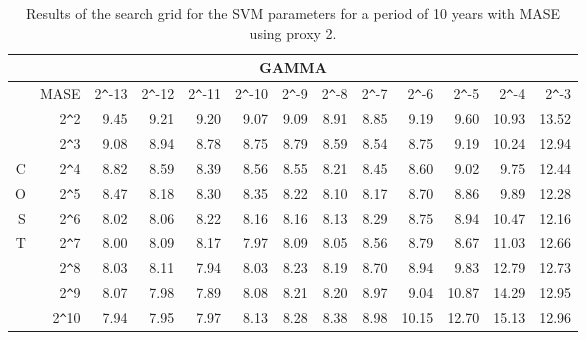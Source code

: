 \begin{table}[h!]
\centering
\begin{adjustbox}{width=\textwidth}
\begin{tabular}{|r|r|rrrrrrrrrrr|}
\hline
\multicolumn{13}{|c|}{GAMMA} \tabularnewline
\hline
 &MASE& 2\verb|^|-13 & 2\verb|^|-12 & 2\verb|^|-11 & 2\verb|^|-10 & 2\verb|^|-9 & 2\verb|^|-8 & 2\verb|^|-7 & 2\verb|^|-6 & 2\verb|^|-5 & 2\verb|^|-4 & 2\verb|^|-3 \\ 
  \hline
  &2\verb|^|2 & 9.45 & 9.21 & 9.20 & 9.07 & 9.09 & 8.91 & 8.85 & 9.19 & 9.60 & 10.93 & 13.52 \\ 
  &2\verb|^|3 & 9.08 & 8.94 & 8.78 & 8.75 & 8.79 & 8.59 & 8.54 & 8.75 & 9.19 & 10.24 & 12.94 \\ 
  C&2\verb|^|4 & 8.82 & 8.59 & 8.39 & 8.56 & 8.55 & 8.21 & 8.45 & 8.60 & 9.02 & 9.75 & 12.44 \\ 
  O&2\verb|^|5 & 8.47 & 8.18 & 8.30 & 8.35 & 8.22 & 8.10 & 8.17 & 8.70 & 8.86 & 9.89 & 12.28 \\ 
  S&2\verb|^|6 & 8.02 & 8.06 & 8.22 & 8.16 & 8.16 & 8.13 & 8.29 & 8.75 & 8.94 & 10.47 & 12.16 \\ 
  T&2\verb|^|7 & 8.00 & 8.09 & 8.17 & 7.97 & 8.09 & 8.05 & 8.56 & 8.79 & 8.67 & 11.03 & 12.66 \\ 
  &2\verb|^|8 & 8.03 & 8.11 & 7.94 & 8.03 & 8.23 & 8.19 & 8.70 & 8.94 & 9.83 & 12.79 & 12.73 \\ 
  &2\verb|^|9 & 8.07 & 7.98 & 7.89 & 8.08 & 8.21 & 8.20 & 8.97 & 9.04 & 10.87 & 14.29 & 12.95 \\ 
  &2\verb|^|10 & 7.94 & 7.95 & 7.97 & 8.13 & 8.28 & 8.38 & 8.98 & 10.15 & 12.70 & 15.13 & 12.96 \\ 
   \hline
\end{tabular}
\end{adjustbox}
\caption{Results of the search grid for the SVM parameters for a period of 10 years with MASE using proxy 2.}
\end{table}